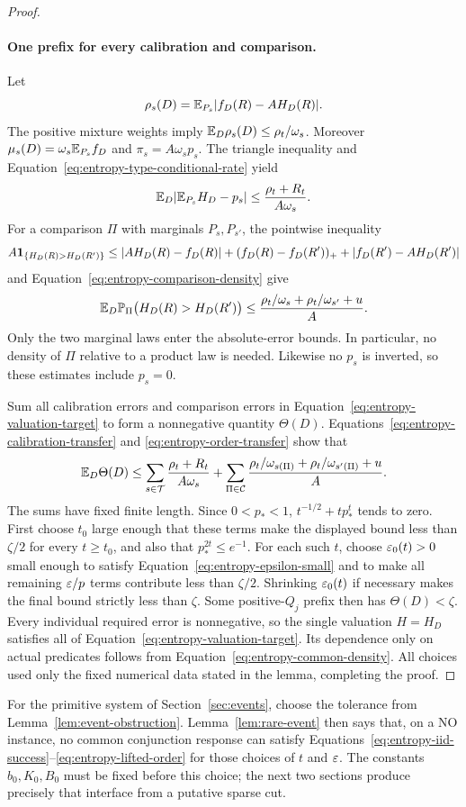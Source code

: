 \begin{proof}
\paragraph{One prefix for every calibration and comparison.}
Let
\[
 \rho_s(D)=\mathbb E_{P_s}\lvert f_D(R)-AH_D(R)\rvert.
\]
The positive mixture weights imply
$\mathbb E_D\rho_s(D)\le\rho_t/\omega_s$.  Moreover
$\mu_s(D)=\omega_s\mathbb E_{P_s}f_D$ and
$\pi_s=A\omega_s p_s$.  The triangle inequality and
Equation~\ref{eq:entropy-type-conditional-rate} yield
\begin{equation}
 \label{eq:entropy-calibration-transfer}
 \mathbb E_D\lvert\mathbb E_{P_s}H_D-p_s\rvert
 \le\frac{\rho_t+R_t}{A\omega_s}.
\end{equation}
For a comparison $\Pi$ with marginals $P_s,P_{s'}$, the pointwise
inequality
\[
 A\mathbf 1_{\{H_D(R)>H_D(R')\}}
 \le\lvert AH_D(R)-f_D(R)\rvert
      +(f_D(R)-f_D(R'))_+
      +\lvert f_D(R')-AH_D(R')\rvert
\]
and Equation~\ref{eq:entropy-comparison-density} give
\begin{equation}
 \label{eq:entropy-order-transfer}
 \mathbb E_D\mathbb P_\Pi\bigl(H_D(R)>H_D(R')\bigr)
 \le\frac{\rho_t/\omega_s+\rho_t/\omega_{s'}+u}{A}.
\end{equation}
Only the two marginal laws enter the absolute-error bounds.  In
particular, no density of $\Pi$ relative to a product law is needed.
Likewise no $p_s$ is inverted, so these estimates include $p_s=0$.

Sum all calibration errors and comparison errors in
Equation~\ref{eq:entropy-valuation-target} to form a nonnegative
quantity $\Theta(D)$.  Equations~\ref{eq:entropy-calibration-transfer}
and \ref{eq:entropy-order-transfer} show that
\[
 \mathbb E_D\Theta(D)
 \le\sum_{s\in\mathcal T}\frac{\rho_t+R_t}{A\omega_s}
 +\sum_{\Pi\in\mathcal C}
   \frac{\rho_t/\omega_{s(\Pi)}
          +\rho_t/\omega_{s'(\Pi)}+u}{A}.
\]
The sums have fixed finite length.  Since $0<p_*<1$,
$t^{-1/2}+tp_*^t$ tends to zero.  First choose $t_0$ large enough that
these terms make the displayed bound less than $\zeta/2$ for every
$t\ge t_0$, and also that $p_*^{2t}\le e^{-1}$.  For each such $t$,
choose $\varepsilon_0(t)>0$ small enough to satisfy
Equation~\ref{eq:entropy-epsilon-small} and to make all remaining
$\varepsilon/p$ terms contribute less than $\zeta/2$.  Shrinking
$\varepsilon_0(t)$ if necessary makes the final bound strictly less than
$\zeta$.  Some positive-$Q_j$ prefix then has $\Theta(D)<\zeta$.
Every individual required error is nonnegative, so the single valuation
$H=H_D$ satisfies all of Equation~\ref{eq:entropy-valuation-target}.
Its dependence only on actual predicates follows from
Equation~\ref{eq:entropy-common-density}.  All choices used only the
fixed numerical data stated in the lemma, completing the proof.
\end{proof}

For the primitive system of Section~\ref{sec:events}, choose the tolerance
from Lemma~\ref{lem:event-obstruction}.  Lemma~\ref{lem:rare-event} then
says that, on a NO instance, no common conjunction response can satisfy
Equations~\ref{eq:entropy-iid-success}--\ref{eq:entropy-lifted-order}
for those choices of $t$ and $\varepsilon$.  The constants $b_0,K_0,B_0$ must
be fixed before this choice; the next two sections produce precisely that
interface from a putative sparse cut.
